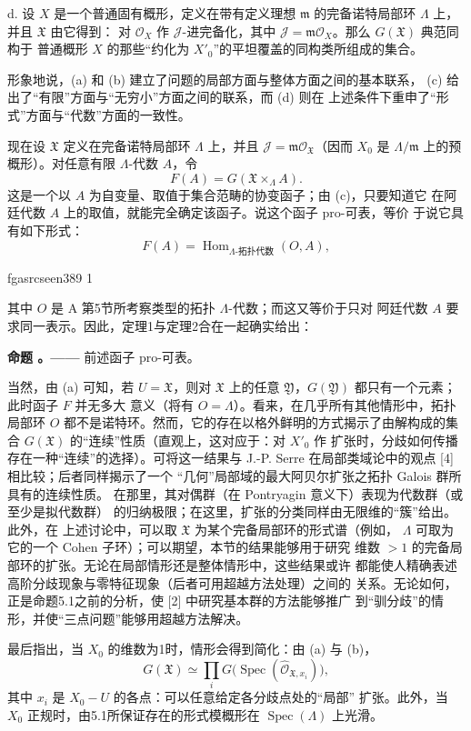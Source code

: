 \documentclass[12pt,twoside,openany]{book}
\numberwithin{equation}{section}
\newcommand{\fgaunitid}{unbound}
\newcommand{\src}[1]{%
  \phantomsection
  \hypertarget{src:\fgaunitid:#1}{}%
  \hypertarget{fga.\fgaunitid.p#1}{}%
  \ifcsname fgasrcseen#1\endcsname\else
    \expandafter\gdef\csname fgasrcseen#1\endcsname{1}%
    \hypertarget{src:#1}{}%
  \fi
  \marginpar{\raggedleft\footnotesize\sffamily #1}%
}
\newcommand{\fquote}[1]{“#1”}
\theoremstyle{plain}
\theoremstyle{definition}
\theoremstyle{remark}
\newcommand{\result}[2]{%
  \par\medskip\noindent\textbf{#1%
  \if\relax\detokenize{#2}\relax\else\space#2\fi。——}\enspace
}
\begin{document}
\noindent d. 设 $X$ 是一个普通固有概形，定义在带有定义理想 $\mathfrak m$
的完备诺特局部环 $\Lambda$ 上，并且 $\mathfrak X$ 由它得到：
对 $\mathcal O_X$ 作 $\mathcal J$-进完备化，其中
$\mathcal J=\mathfrak m\mathcal O_X$。那么 $G(\mathfrak X)$ 典范同构于
普通概形 $X$ 的那些\fquote{约化为 $X'_0$}的平坦覆盖的同构类所组成的集合。

形象地说，(a) 和 (b) 建立了问题的局部方面与整体方面之间的基本联系，
(c) 给出了\fquote{有限}方面与\fquote{无穷小}方面之间的联系，而 (d) 则在
上述条件下重申了\fquote{形式}方面与\fquote{代数}方面的一致性。

现在设 $\mathfrak X$ 定义在完备诺特局部环 $\Lambda$ 上，并且
$\mathcal J=\mathfrak m\mathcal O_{\mathfrak X}$（因而 $X_0$ 是
$\Lambda/\mathfrak m$ 上的预概形）。对任意有限 $\Lambda$-代数 $A$，令
\[
  F(A)=G(\mathfrak X\times_\Lambda A).
\]
这是一个以 $A$ 为自变量、取值于集合范畴的协变函子；由 (c)，只要知道它
在阿廷代数 $A$ 上的取值，就能完全确定该函子。说这个函子 pro-可表，等价
于说它具有如下形式：
\[
  F(A)=\operatorname{Hom}_{\Lambda\text{-拓扑代数}}(O,A),
\]

\src{389}
其中 $O$ 是 A 第5节所考察类型的拓扑 $\Lambda$-代数；而这又等价于只对
阿廷代数 $A$ 要求同一表示。因此，定理1与定理2合在一起确实给出：

\result{命题}{5.1} 前述函子 pro-可表。

当然，由 (a) 可知，若 $U=\mathfrak X$，则对 $\mathfrak X$ 上的任意
$\mathfrak Y$，$G(\mathfrak Y)$ 都只有一个元素；此时函子 $F$ 并无多大
意义（将有 $O=\Lambda$）。看来，在几乎所有其他情形中，拓扑局部环 $O$
都不是诺特环。然而，它的存在以格外鲜明的方式揭示了由解构成的集合
$G(\mathfrak X)$ 的\fquote{连续}性质（直观上，这对应于：对 $X'_0$ 作
扩张时，分歧如何传播存在一种\fquote{连续}的选择）。可将这一结果与
J.-P. Serre 在局部类域论中的观点 [4] 相比较；后者同样揭示了一个
\fquote{几何}局部域的最大阿贝尔扩张之拓扑 Galois 群所具有的连续性质。
在那里，其对偶群（在 Pontryagin 意义下）表现为代数群（或至少是拟代数群）
的归纳极限；在这里，扩张的分类同样由无限维的\fquote{簇}给出。此外，在
上述讨论中，可以取 $\mathfrak X$ 为某个完备局部环的形式谱（例如，
$\Lambda$ 可取为它的一个 Cohen 子环）；可以期望，本节的结果能够用于研究
维数 $>1$ 的完备局部环的扩张。无论在局部情形还是整体情形中，这些结果或许
都能使人精确表述高阶分歧现象与零特征现象（后者可用超越方法处理）之间的
关系。无论如何，正是命题5.1之前的分析，使 [2] 中研究基本群的方法能够推广
到\fquote{驯分歧}的情形，并使\fquote{三点问题}能够用超越方法解决。

最后指出，当 $X_0$ 的维数为1时，情形会得到简化：由 (a) 与 (b)，
\[
  G(\mathfrak X)\simeq
  \prod_iG\bigl(\operatorname{Spec}(\widehat{\mathcal O}_{\mathfrak X,x_i})\bigr),
\]
其中 $x_i$ 是 $X_0-U$ 的各点：可以任意给定各分歧点处的\fquote{局部}
扩张。此外，当 $X_0$ 正规时，由5.1所保证存在的形式模概形在
$\operatorname{Spec}(\Lambda)$ 上光滑。
\end{document}
